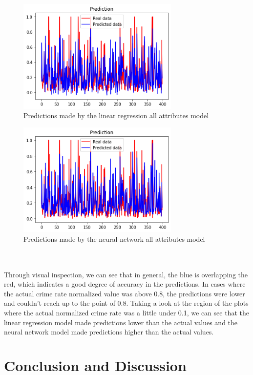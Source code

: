 \documentclass[letterpaper, 11 pt, conference]{article}
\begin{document}
\begin{figure}[H]
\centering
\includegraphics[width=8cm]{pred_all.png}
\caption{Predictions made by the linear regression all attributes model}
\label{fig:hotbo}
\end{figure}

\begin{figure}[H]
\centering
\includegraphics[width=8cm]{pred_nn.png}
\caption{Predictions made by the neural network all attributes model}
\label{fig:hotbo}
\end{figure}
\\
\\Through visual inspection, we can see that in general, the blue is overlapping the red, which indicates a good degree of accuracy in the predictions. In cases where the actual crime rate normalized value was above 0.8, the predictions were lower and couldn't reach up to the point of 0.8. Taking a look at the region of the plots where the actual normalized crime rate was a little under 0.1, we can see that the linear regression model made predictions lower than the actual values and the neural network model made predictions higher than the actual values.
\\
\section{Conclusion and Discussion}
\end{document}
